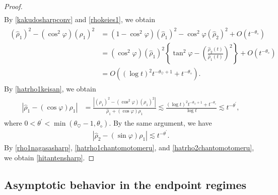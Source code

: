 \documentclass[reqno]{amsart}
\theoremstyle{plain}
\theoremstyle{definition}
\numberwithin{equation}{section}
\begin{document}
\begin{proof}
\begin{align}
\end{align}
By \eqref{kakudosharpconv} and \eqref{rhokeies1}, we obtain
\begin{align}\label{hatrho1keisan}
\begin{aligned}
\left(\hat{\rho}_1\right)^2-\left(\cos^2{\varphi}\right)\left(\rho_1\right)^2&=\left(1-\cos^2{\varphi}\right)\left(\hat{\rho}_1\right)^2-\cos^2\varphi\left(\hat{\rho}_2\right)^2+O\left(t^{-\theta_{\diamond}}\right)
\\
&=\left(\cos^2{\varphi}\right)\left(\hat{\rho}_1\right)^2\left\{\tan^2{\varphi}-\left(\frac{\hat{\rho}_2(t)}{\hat{\rho}_1(t)}\right)^2\right\}+O\left(t^{-\theta_{\diamond}}\right)
\\
&=O\left((\log{t})^2t^{-\theta_{\heartsuit}+1}+t^{-\theta_{\diamond}}\right).
\end{aligned}
\end{align}
By \eqref{hatrho1keisan}, we obtain
\begin{align}\label{hatrho1chantomotomeru}
\begin{aligned}
\left|\hat{\rho}_1-\left(\cos{\varphi}\right)\rho_1\right|&=\frac{\left|\left(\hat{\rho}_1\right)^2-\left(\cos^2{\varphi}\right)\left(\rho_1\right)^2\right|}{\hat{\rho}_1+\left(\cos{\varphi}\right)\rho_1}\lesssim \frac{(\log{t})^2t^{-\theta_{\heartsuit}+1}+t^{-\theta_{\diamond}}}{\log{t}}\lesssim t^{-\theta^{\prime}},
\end{aligned}
\end{align}
where $0<\theta^{\prime}<\min{(\theta_{\heartsuit}-1,\theta_{\diamond})}$. By the same argument, we have
\begin{align}\label{hatrho2chantomotomeru}
\left|\hat{\rho}_2-\left(\sin{\varphi}\right)\rho_1\right|\lesssim t^{-\theta^{\prime}}.
\end{align}
By \eqref{rho1nagasasharp}, \eqref{hatrho1chantomotomeru}, and \eqref{hatrho2chantomotomeru}, we obtain \eqref{hitantensharp}.

\end{proof}

\subsection{Asymptotic behavior in the endpoint regimes}
\end{document}
